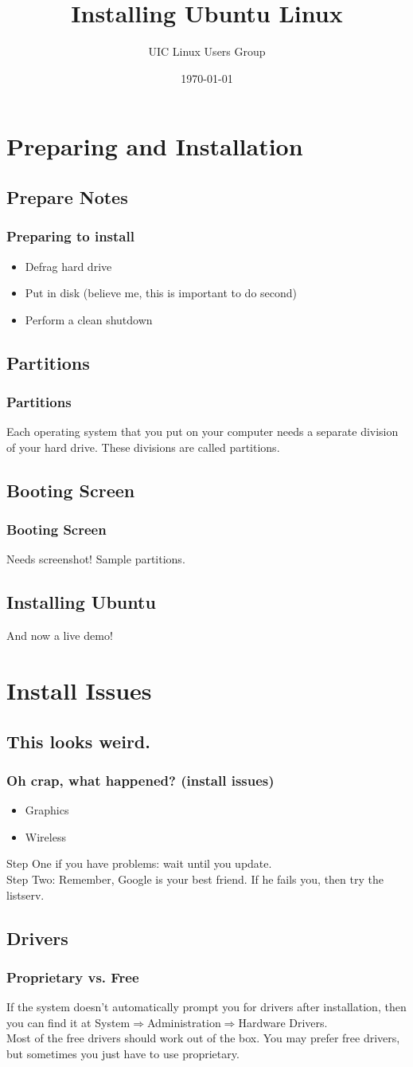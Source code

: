 \documentclass[hyperref={pdfpagelabels=false}]{beamer}
\title{Installing Ubuntu Linux}
\author{UIC Linux Users Group}
\date{\today}
\begin{document}
\frame{\titlepage}
\section{Preparing and Installation}
\subsection{Prepare Notes}
\frame
{
    \frametitle{Preparing to install}
    \begin{itemize}
    \item{Defrag hard drive}
	\item{Put in disk (believe me, this is important to do second)}
    \item{Perform a clean shutdown}
    \end{itemize}
}
\subsection{Partitions}
\frame
{
	\frametitle{Partitions}
	Each operating system that you put on your computer needs a separate division of your hard drive. These divisions are called partitions.
}
\subsection{Booting Screen}
\frame
{
	\frametitle{Booting Screen}
	Needs screenshot! Sample partitions.
}
\subsection{Installing Ubuntu}
\frame
{
	And now a live demo!
}
\section{Install Issues}
\subsection{This looks weird.}
\frame
{
	\frametitle{Oh crap, what happened? (install issues)}
	\begin{itemize}
	\item{Graphics}
	\item{Wireless}
	\end{itemize}
	Step One if you have problems: wait until you update.\\
	Step Two: Remember, Google is your best friend. If he fails you, then try the listserv.
}
\subsection{Drivers}
\frame
{
	\frametitle{Proprietary vs. Free}
	If the system doesn't automatically prompt you for drivers after installation, then you can find it at System$\Rightarrow$Administration$\Rightarrow$Hardware Drivers. \\
	Most of the free drivers should work out of the box. You may prefer free drivers, but sometimes you just have to use proprietary.
}
\end{document}

